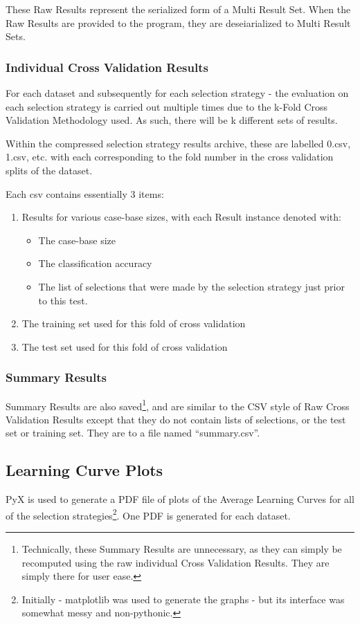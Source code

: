 \documentclass[a4paper,11pt]{report}
\begin{document}
These Raw Results represent the serialized form of a Multi Result Set. When the Raw Results are provided to the program, they are deseiarialized to Multi Result Sets.

\subsubsection{Individual Cross Validation Results}
For each dataset and subsequently for each selection strategy - the evaluation on each selection strategy is carried out multiple times due to the k-Fold Cross Validation Methodology used. As such, there will be k different sets of results. 

Within the compressed selection strategy results archive, these are labelled 0.csv, 1.csv, etc. with each corresponding to the fold number in the cross validation splits of the dataset.

Each csv contains essentially 3 items:

\begin{enumerate}
	\item Results for various case-base sizes, with each Result instance denoted with:
		\begin{itemize}
			\item The case-base size
			\item The classification accuracy
			\item The list of selections that were made by the selection strategy just prior to this test.
		\end{itemize}
	\item The training set used for this fold of cross validation
	\item The test set used for this fold of cross validation
\end{enumerate}

\subsubsection{Summary Results}
Summary Results are also saved\footnote{Technically, these Summary Results are unnecessary, as they can simply be recomputed using the raw individual Cross Validation Results. They are simply there for user ease.}, and are similar to the CSV style of Raw Cross Validation Results except that they do not contain lists of selections, or the test set or training set. They are to a file named ``summary.csv''.

\subsection{Learning Curve Plots}
PyX \citep{prog:pyx} is used to generate a PDF file of plots of the Average Learning Curves for all of the selection strategies\footnote{Initially - matplotlib \citep{prog:matplotlib} was used to generate the graphs - but its interface was somewhat messy and non-pythonic.}. One PDF is generated for each dataset.
\end{document}
